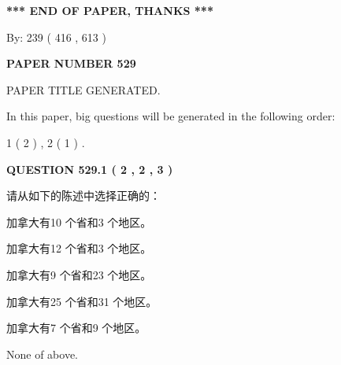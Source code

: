 \documentclass{ctexart}
\begin{document}
   
   
   
\vspace{1.0in} 
{\textbf{\large{ *** END OF PAPER, THANKS *** }}} 
   
   
\hspace{1.0in} By: 
 239 ( 416 ,  613 )
   
   
   
   
\newpage 
\setcounter{page}{ 
   529001 } 
   
   
   
   
 {\textbf{ \Large{ PAPER NUMBER  529  }}}
   
   
\vspace{0.2in}
   
   
   
   
   
   
   
   
 \vspace{0.2in}
 
 
 
 
   
   
 PAPER TITLE GENERATED.
   
   
   
\vspace{0.2in}
   
In this paper, big questions will be generated in the following order: 
   
   
   1 ( 2 )
 ,
   2 ( 1 )
 .
  
\vspace{0.2in}
  
{\textbf{\Large{QUESTION
529.1 
 ( 2 , 2 , 3 )
}}}
  
  
请从如下的陈述中选择正确的：
 
 
加拿大有10 个省和3 个地区。
 
 
加拿大有12 个省和3 个地区。
 
 
加拿大有9 个省和23 个地区。
 
 
加拿大有25 个省和31 个地区。
 
 
加拿大有7 个省和9 个地区。
 
 
 None of above.
 
 
\noindent{}
 
\end{document}
